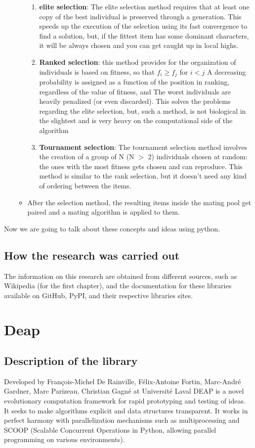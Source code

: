 \documentclass{article}
\begin{document}
\begin{enumerate}
\begin{itemize}
\begin{enumerate}
				\item \textbf{elite selection}: The elite selection method requires that at least one copy of the best individual is preserved through a generation. This speeds up the execution of the selection using its fast convergence to find a solution, but, if the fittest item has some dominant characters, it will be always chosen and you can get caught up in local highs. 
				\item \textbf{Ranked selection}: this method provides for the organization of individuals is based on fitness, so that $ f_i \geq f_j $ for $i<j$
				\subitem A decreasing probability is assigned as a function of the position in ranking, regardless of the value of fitness, and The worst individuals are heavily penalized (or even discarded). This solves the problems regarding the elite selection, but, such a method, is not biological in the slightest and is very heavy on the computational side of the algorithm
				\item \textbf{Tournament selection}: The tournament selection method involves the creation of a group of N (N $>$ 2) individuals chosen at random: the ones with the most fitness gets chosen and can reproduce. This method is similar to the rank selection, but it doesn't need any kind of ordering between the items.
			\end{enumerate}
			\item After the selection method, the resulting items inside the mating pool get paired and a mating algorithm is applied to them.            
		\end{itemize}
	\end{enumerate}
	
	Now we are going to talk about these concepts and ideas using python.
	
	
	
	
	\subsection{How the research was carried out}
	The information on this research are obtained from different sources, such as Wikipedia (for the first chapter), and the documentation for these libraries available on GitHub, PyPI, and their respective libraries sites. 
	
	\section{Deap}
	\subsection{Description of the library}
	Developed by François-Michel De Rainville, Félix-Antoine Fortin, Marc-André Gardner, Marc Parizeau, Christian Gagné at Université Laval 
	DEAP is a novel evolutionary computation framework for rapid prototyping and testing of ideas. It seeks to make algorithms explicit and data structures transparent. It works in perfect harmony with parallelization mechanisms such as multiprocessing and SCOOP (Scalable Concurrent Operations in Python, allowing parallel programming on various environments).
\end{document}
